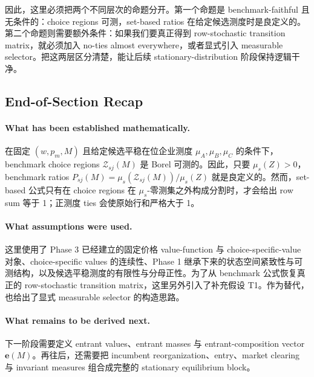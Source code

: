 因此，这里必须把两个不同层次的命题分开。第一个命题是 benchmark-faithful 且无条件的：choice regions 可测，set-based ratios 在给定候选测度时是良定义的。第二个命题则需要额外条件：如果我们要真正得到 row-stochastic transition matrix，就必须加入 no-ties almost everywhere，或者显式引入 measurable selector。把这两层区分清楚，能让后续 stationary-distribution 阶段保持逻辑干净。

\subsection{End-of-Section Recap}

\paragraph{What has been established mathematically.}
在固定 $(w,p_m,M)$ 且给定候选平稳在位企业测度 $\mu_A,\mu_B,\mu_C$ 的条件下，benchmark choice regions $\mathcal Z_{sj}(M)$ 是 Borel 可测的。因此，只要 $\mu_s(Z)>0$，benchmark ratios $P_{sj}(M)=\mu_s(\mathcal Z_{sj}(M))/\mu_s(Z)$ 就是良定义的。然而，set-based 公式只有在 choice regions 在 $\mu_s$-零测集之外构成分割时，才会给出 row sum 等于 1；正测度 ties 会使原始行和严格大于 1。

\paragraph{What assumptions were used.}
这里使用了 Phase 3 已经建立的固定价格 value-function 与 choice-specific-value 对象、choice-specific values 的连续性、Phase 1 继承下来的状态空间紧致性与可测结构，以及候选平稳测度的有限性与分母正性。为了从 benchmark 公式恢复真正的 row-stochastic transition matrix，这里另外引入了补充假设 T1。作为替代，也给出了显式 measurable selector 的构造思路。

\paragraph{What remains to be derived next.}
下一阶段需要定义 entrant values、entrant masses 与 entrant-composition vector $\mathbf e(M)$。再往后，还需要把 incumbent reorganization、entry、market clearing 与 invariant measures 组合成完整的 stationary equilibrium block。
